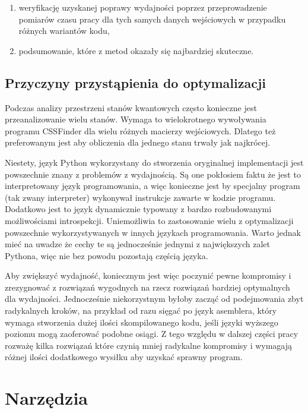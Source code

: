 \documentclass[11pt, a4paper]{article}
\begin{document}
\begin{sloppypar}
\begin{enumerate}
      \item weryfikację uzyskanej poprawy wydajności poprzez przeprowadzenie pomiarów czasu
        pracy dla tych samych danych wejściowych w przypadku różnych wariantów kodu,

      \item podsumowanie, które z metod okazały się najbardziej skuteczne.
    \end{enumerate}

    \subsection{Przyczyny przystąpienia do optymalizacji}
    Podczas analizy przestrzeni stanów kwantowych często konieczne jest przeanalizowanie
    wielu stanów. Wymaga to wielokrotnego wywoływania programu CSSFinder dla wielu
    różnych macierzy wejściowych. Dlatego też preferowanym jest aby obliczenia dla jednego
    stanu trwały jak najkrócej.

    Niestety, język Python wykorzystany do stworzenia oryginalnej implementacji jest
    powszechnie znany z problemów z wydajnością\cite{srinath2017python}. Są one
    pokłosiem faktu że jest to interpretowany język programowania, a więc konieczne jest
    by specjalny program (tak zwany interpreter) wykonywał instrukcje zawarte w kodzie programu.
    Dodatkowo jest to język dynamicznie typowany z bardzo rozbudowanymi możliwościami
    introspekcji. Uniemożliwia to zastosowanie wielu z optymalizacji powszechnie wykorzystywanych
    w innych językach programowania. Warto jednak mieć na uwadze że cechy te są
    jednocześnie jednymi z największych zalet Pythona, więc nie bez powodu pozostają częścią
    języka.

    Aby zwiększyć wydajność, koniecznym jest więc poczynić pewne kompromisy i
    zrezygnować z rozwiązań wygodnych na rzecz rozwiązań bardziej optymalnych dla
    wydajności. Jednocześnie niekorzystnym byłoby zacząć od podejmowania zbyt radykalnych
    kroków, na przykład od razu sięgać po język asemblera, który wymaga stworzenia dużej
    ilości skompilowanego kodu, jeśli języki wyższego poziomu mogą zaoferować podobne
    osiągi. Z tego względu w dalszej części pracy rozważę kilka rozwiązań które czynią mniej
    radykalne kompromisy i wymagają różnej ilości dodatkowego wysiłku aby uzyskać sprawny
    program.

    \section{Narzędzia}

\end{sloppypar}
\end{document}
